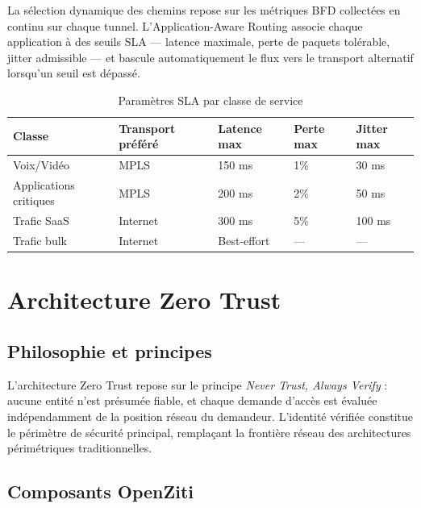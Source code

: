 \documentclass[12pt,a4paper,oneside]{report}
\begin{document}
	La sélection dynamique des chemins repose sur les métriques BFD collectées
	en continu sur chaque tunnel. L'Application-Aware Routing associe chaque
	application à des seuils SLA --- latence maximale, perte de paquets tolérable,
	jitter admissible --- et bascule automatiquement le flux vers le transport
	alternatif lorsqu'un seuil est dépassé.
	
	\begin{table}[H]
		\centering
		\caption{Paramètres SLA par classe de service}
		\renewcommand{\arraystretch}{1.4}
		\begin{tabularx}{\textwidth}{|l|l|l|l|l|}
			\hline
			\textbf{Classe} & \textbf{Transport préféré} & \textbf{Latence max} &
			\textbf{Perte max} & \textbf{Jitter max} \\
			\hline
			Voix/Vidéo & MPLS & 150 ms & 1\% & 30 ms \\
			\hline
			Applications critiques & MPLS & 200 ms & 2\% & 50 ms \\
			\hline
			Trafic SaaS & Internet & 300 ms & 5\% & 100 ms \\
			\hline
			Trafic bulk & Internet & Best-effort & --- & --- \\
			\hline
		\end{tabularx}
	\end{table}
	\section{Architecture Zero Trust}
	
	\subsection{Philosophie et principes}
	
	L'architecture Zero Trust repose sur le principe \textit{Never Trust, Always
		Verify} : aucune entité n'est présumée fiable, et chaque demande d'accès est
	évaluée indépendamment de la position réseau du demandeur. L'identité
	vérifiée constitue le périmètre de sécurité principal, remplaçant la frontière
	réseau des architectures périmétriques traditionnelles.
	
	\subsection{Composants OpenZiti}
	
\end{document}
